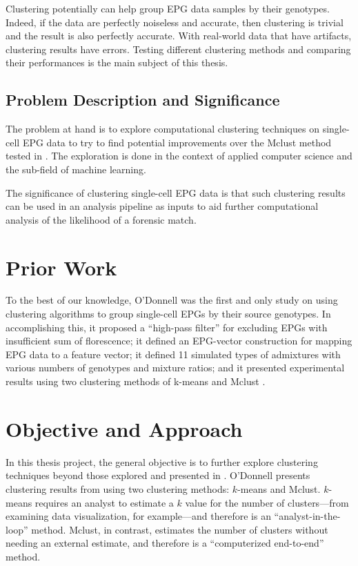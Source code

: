 Clustering potentially can help group EPG data samples by their genotypes. Indeed, if the data are perfectly noiseless and accurate, then clustering is trivial and the result is also perfectly accurate. With real-world data that have artifacts, clustering results have errors. Testing different clustering methods and comparing their performances is the main subject of this thesis.

\subsection{Problem Description and Significance}

The problem at hand is to explore computational clustering techniques on single-cell EPG data to try to find potential improvements over the Mclust method tested in \cite{odonnell_clustering_2021}. The exploration is done in the context of applied computer science and the sub-field of machine learning.

The significance of clustering single-cell EPG data is that such clustering results can be used in an analysis pipeline as inputs to aid further computational analysis of the likelihood of a forensic match.

\section{Prior Work}

To the best of our knowledge, O'Donnell \cite{odonnell_clustering_2021} was the first and only study on using clustering algorithms to group single-cell EPGs by their source genotypes. In accomplishing this, it proposed a ``high-pass filter'' for excluding EPGs with insufficient sum of florescence; it defined an EPG-vector construction for mapping EPG data to a feature vector; it defined 11 simulated types of admixtures with various numbers of genotypes and mixture ratios; and it presented experimental results using two clustering methods of k-means and Mclust \cite{scrucca_mclust_2016}.

\section{Objective and Approach}

In this thesis project, the general objective is to further explore clustering techniques beyond those explored and presented in \cite{odonnell_clustering_2021}. O'Donnell \cite{odonnell_clustering_2021} presents clustering results from using two clustering methods: $k$-means and Mclust. $k$-means requires an analyst to estimate a $k$ value for the number of clusters---from examining data visualization, for example---and therefore is an ``analyst-in-the-loop'' method. Mclust, in contrast, estimates the number of clusters without needing an external estimate, and therefore is a ``computerized end-to-end'' method.

